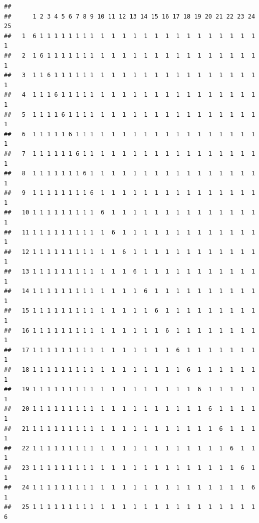 \documentclass[
]{book}
\newenvironment{Shaded}{\begin{snugshade}}{\end{snugshade}}
\newcommand{\FloatTok}[1]{\textcolor[rgb]{0.00,0.00,0.81}{#1}}
\newcommand{\FunctionTok}[1]{\textcolor[rgb]{0.00,0.00,0.00}{#1}}
\newcommand{\NormalTok}[1]{#1}
\newcommand{\SpecialCharTok}[1]{\textcolor[rgb]{0.00,0.00,0.00}{#1}}
\begin{document}
\begin{verbatim}
##     
##      1 2 3 4 5 6 7 8 9 10 11 12 13 14 15 16 17 18 19 20 21 22 23 24 25
##   1  6 1 1 1 1 1 1 1 1  1  1  1  1  1  1  1  1  1  1  1  1  1  1  1  1
##   2  1 6 1 1 1 1 1 1 1  1  1  1  1  1  1  1  1  1  1  1  1  1  1  1  1
##   3  1 1 6 1 1 1 1 1 1  1  1  1  1  1  1  1  1  1  1  1  1  1  1  1  1
##   4  1 1 1 6 1 1 1 1 1  1  1  1  1  1  1  1  1  1  1  1  1  1  1  1  1
##   5  1 1 1 1 6 1 1 1 1  1  1  1  1  1  1  1  1  1  1  1  1  1  1  1  1
##   6  1 1 1 1 1 6 1 1 1  1  1  1  1  1  1  1  1  1  1  1  1  1  1  1  1
##   7  1 1 1 1 1 1 6 1 1  1  1  1  1  1  1  1  1  1  1  1  1  1  1  1  1
##   8  1 1 1 1 1 1 1 6 1  1  1  1  1  1  1  1  1  1  1  1  1  1  1  1  1
##   9  1 1 1 1 1 1 1 1 6  1  1  1  1  1  1  1  1  1  1  1  1  1  1  1  1
##   10 1 1 1 1 1 1 1 1 1  6  1  1  1  1  1  1  1  1  1  1  1  1  1  1  1
##   11 1 1 1 1 1 1 1 1 1  1  6  1  1  1  1  1  1  1  1  1  1  1  1  1  1
##   12 1 1 1 1 1 1 1 1 1  1  1  6  1  1  1  1  1  1  1  1  1  1  1  1  1
##   13 1 1 1 1 1 1 1 1 1  1  1  1  6  1  1  1  1  1  1  1  1  1  1  1  1
##   14 1 1 1 1 1 1 1 1 1  1  1  1  1  6  1  1  1  1  1  1  1  1  1  1  1
##   15 1 1 1 1 1 1 1 1 1  1  1  1  1  1  6  1  1  1  1  1  1  1  1  1  1
##   16 1 1 1 1 1 1 1 1 1  1  1  1  1  1  1  6  1  1  1  1  1  1  1  1  1
##   17 1 1 1 1 1 1 1 1 1  1  1  1  1  1  1  1  6  1  1  1  1  1  1  1  1
##   18 1 1 1 1 1 1 1 1 1  1  1  1  1  1  1  1  1  6  1  1  1  1  1  1  1
##   19 1 1 1 1 1 1 1 1 1  1  1  1  1  1  1  1  1  1  6  1  1  1  1  1  1
##   20 1 1 1 1 1 1 1 1 1  1  1  1  1  1  1  1  1  1  1  6  1  1  1  1  1
##   21 1 1 1 1 1 1 1 1 1  1  1  1  1  1  1  1  1  1  1  1  6  1  1  1  1
##   22 1 1 1 1 1 1 1 1 1  1  1  1  1  1  1  1  1  1  1  1  1  6  1  1  1
##   23 1 1 1 1 1 1 1 1 1  1  1  1  1  1  1  1  1  1  1  1  1  1  6  1  1
##   24 1 1 1 1 1 1 1 1 1  1  1  1  1  1  1  1  1  1  1  1  1  1  1  6  1
##   25 1 1 1 1 1 1 1 1 1  1  1  1  1  1  1  1  1  1  1  1  1  1  1  1  6
\end{verbatim}

\begin{Shaded}
\end{Shaded}
\end{document}
